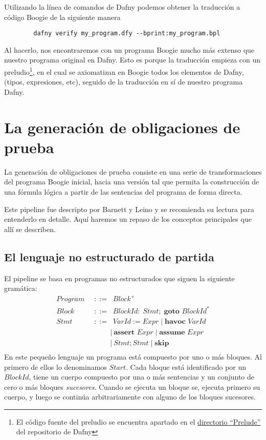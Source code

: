 \documentclass[12pt, a4paper, openany, fleqn]{book}
\begin{document}
    Utilizando la línea de comandos de Dafny podemos obtener la traducción a código Boogie de la siguiente manera
    \begin{verbatim}
        dafny verify my_program.dfy --bprint:my_program.bpl
    \end{verbatim}
    Al hacerlo, nos encontraremos con un programa Boogie mucho más extenso que nuestro programa original en Dafny. Esto es porque la traducción empieza con un preludio\footnote{El código fuente del preludio se encuentra apartado en el \href{https://github.com/dafny-lang/dafny/blob/v4.7.0/Source/DafnyCore/DafnyPrelude.bpl}{directorio ``Prelude''} del repositorio de Dafny}, en el cual se axiomatizan en Boogie todos los elementos de Dafny, (tipos, expresiones, etc), seguido de la traducción en sí de nuestro programa Dafny.

    \section{La generación de obligaciones de prueba}
    La generación de obligaciones de prueba consiste en una serie de transformaciones del programa Boogie inicial, hacia una versión tal que permita la construcción de una fórmula lógica a partir de las sentencias del programa de forma directa.

    Este pipeline fue descripto por Barnett y Leino\cite{10.1145/1108792.1108813} y se recomienda su lectura para entenderlo en detalle. Aquí haremos un repaso de los conceptos principales que allí se describen.

    \subsection*{ El lenguaje no estructurado de partida}
    El pipeline se basa en programas no estructurados que siguen la siguiente gramática:
    \begin{align*}
        Program \;\;&::=\;\; Block^{+} \\
          Block \;\;&::=\;\; BlockId :\; Stmt;\;\textbf{goto } BlockId^{*} \\
           Stmt \;\;&::=\;\; VarId := Expr\;|\;\textbf{havoc } VarId \\
                &\;\;\;\;\;\;\;\;|\ \textbf{assert } Expr\;|\;\textbf{assume } Expr \\
                &\;\;\;\;\;\;\;\;|\ Stmt ; Stmt \;|\; \textbf{skip} \\
    \end{align*}
    En este pequeño lenguaje un programa está compuesto por uno o más bloques. Al primero de ellos lo denominamos $Start$. Cada bloque está identificado por un $BlockId$, tiene un cuerpo compuesto por una o más sentencias y un conjunto de cero o más bloques \textit{sucesores}. Cuando se ejecuta un bloque se, ejecuta primero su cuerpo, y luego se continúa arbitrariamente con alguno de los bloques sucesores. 
\end{document}
